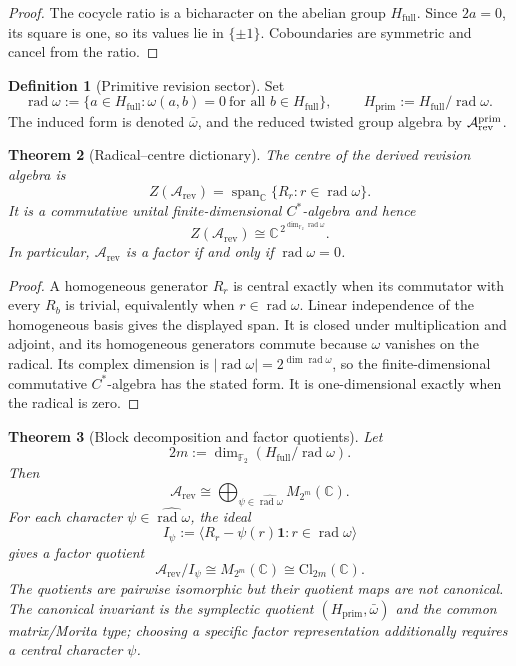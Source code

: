 \documentclass[11pt]{article}
\newtheorem{theorem}{Theorem}[section]
\theoremstyle{definition}
\newtheorem{definition}[theorem]{Definition}
\theoremstyle{remark}
\newcommand{\C}{\mathbb{C}}
\newcommand{\F}{\mathbb{F}}
\newcommand{\Arev}{\mathcal{A}_{\mathrm{rev}}}
\newcommand{\Hf}{H_{\mathrm{full}}}
\newcommand{\Cl}{\mathrm{Cl}}
\newcommand{\rad}{\operatorname{rad}}
\newcommand{\one}{\mathbf{1}}
\newcommand{\Hprim}{H_{\mathrm{prim}}}
\begin{document}
\begin{proof}
The cocycle ratio is a bicharacter on the abelian group \(\Hf\).  Since
\(2a=0\), its square is one, so its values lie in \(\{\pm1\}\).  Coboundaries
are symmetric and cancel from the ratio.
\end{proof}

\begin{definition}[Primitive revision sector]
\label{def:primitive-reduction}
Set
\[
  \rad\omega:=\{a\in\Hf:\omega(a,b)=0\ \text{for all }b\in\Hf\},
  \qquad
  \boxed{\ \Hprim:=\Hf/\rad\omega.\ }
\]
The induced form is denoted \(\bar\omega\), and the reduced twisted group
algebra by \(\Arev^{\rm prim}\).
\end{definition}

\begin{theorem}[Radical--centre dictionary]
\label{thm:radical-centre}
The centre of the derived revision algebra is
\[
  Z(\Arev)
  =\operatorname{span}_{\C}\{R_r:r\in\rad\omega\}.
\]
It is a commutative unital finite-dimensional \(C^*\)-algebra and hence
\[
  Z(\Arev)\cong\C^{\,2^{\dim_{\F_2}\rad\omega}}.
\]
In particular, \(\Arev\) is a factor if and only if \(\rad\omega=0\).
\end{theorem}

\begin{proof}
A homogeneous generator \(R_r\) is central exactly when its commutator with
every \(R_b\) is trivial, equivalently when \(r\in\rad\omega\).  Linear
independence of the homogeneous basis gives the displayed span.  It is closed
under multiplication and adjoint, and its homogeneous generators commute
because \(\omega\) vanishes on the radical.  Its complex dimension is
\(|\rad\omega|=2^{\dim\rad\omega}\), so the finite-dimensional commutative
\(C^*\)-algebra has the stated form.  It is one-dimensional exactly when the
radical is zero.
\end{proof}

\begin{theorem}[Block decomposition and factor quotients]
\label{thm:factor-quotients-corrected}
Let
\[
  2m:=\dim_{\F_2}(\Hf/\rad\omega).
\]
Then
\[
  \boxed{\ \Arev
  \cong\bigoplus_{\psi\in\widehat{\rad\omega}}M_{2^m}(\C).\ }
\]
For each character \(\psi\in\widehat{\rad\omega}\), the ideal
\[
  I_\psi
  :=\bigl\langle R_r-\psi(r)\one:r\in\rad\omega\bigr\rangle
\]
gives a factor quotient
\[
  \Arev/I_\psi\cong M_{2^m}(\C)\cong\Cl_{2m}(\C).
\]
The quotients are pairwise isomorphic but their quotient maps are not canonical.
The canonical invariant is the symplectic quotient
\((\Hprim,\bar\omega)\) and the common matrix/Morita type; choosing a specific
factor representation additionally requires a central character \(\psi\).
\end{theorem}
\end{document}
